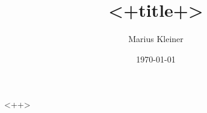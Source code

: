 \documentclass[draft,a4paper]{article}
\title{<+title+>}
\author{Marius Kleiner}
\date{\today}
\begin{document}
\maketitle

<++>

%
\end{document}
